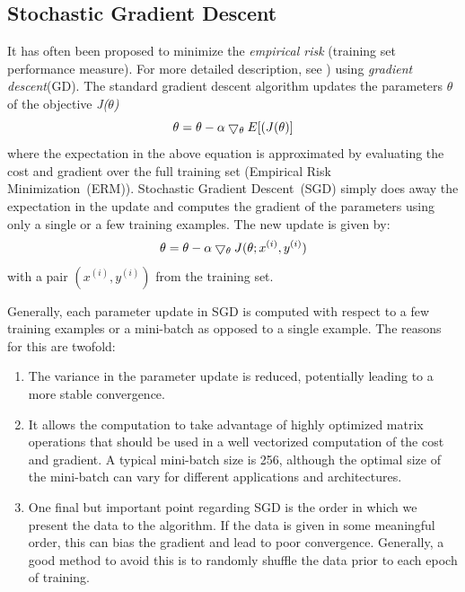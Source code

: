 \subsection{Stochastic Gradient Descent}
\label{subsec:sgd}
It has often been proposed to minimize the \textit{empirical risk} (training set performance measure). For more detailed description, see \cite{vapnik1998statistical}) using \textit{gradient descent}(GD)\cite{bottou2010large}. The standard gradient descent algorithm updates the parameters $\theta$ of the objective \textit{J($\theta$)}  
\begin{equation}
\centering \theta = \theta - \alpha \bigtriangledown_\theta E[(J(\theta)]
\end{equation}
where the expectation in the above equation is approximated by evaluating the cost and gradient over the full training set (Empirical Risk Minimization~(ERM)). Stochastic Gradient Descent~(SGD) simply does away the expectation in the update and computes the gradient of the parameters using only a single or a few training examples. The new update is given by:
\begin{equation}
\centering \theta = \theta - \alpha \bigtriangledown_\theta J(\theta; x^{(i)}, y^{(i)})
\end{equation}
with a pair $(x^{(i)}, y^{(i)})$ from the training set\cite{sgd}. 

Generally, each parameter update in SGD is computed with respect to a few training examples or a mini-batch as opposed to a single example. The reasons for this are twofold\cite{sgd}:
\begin{enumerate}
	\item The variance in the parameter update is reduced, potentially leading to a more stable convergence. 
	\item It allows the computation to take advantage of highly optimized matrix operations that should be used in a well vectorized computation of the cost and gradient.  A typical mini-batch size is 256, although the optimal size of the mini-batch can vary for different applications and architectures.
	\item One final but important point regarding SGD is the order in which we present the data to the algorithm. If the data is given in some meaningful order, this can bias the gradient and lead to poor convergence. Generally, a good method to avoid this is to randomly shuffle the data prior to each epoch of training.
\end{enumerate}

